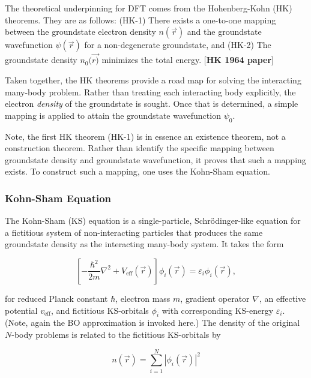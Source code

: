         The theoretical underpinning for DFT comes from the Hohenberg-Kohn (HK) theorems. They are as follows: (HK-1) There exists a one-to-one mapping between the groundstate electron density $n(\Vec{r})$ and the groundstate wavefunction $\psi (\Vec{r})$ for a non-degenerate groundstate, and (HK-2) The groundstate density $n_0(\Vec{r)}$ minimizes the total energy. [\textbf{HK 1964 paper}]
        
        Taken together, the HK theorems provide a road map for solving the interacting many-body problem. Rather than treating each interacting body explicitly, the electron \textit{density} of the groundstate is sought. Once that is determined, a simple mapping is applied to attain the groundstate wavefunction $\psi_0$.
        
        Note, the first HK theorem (HK-1) is in essence an existence theorem, not a construction theorem. Rather than identify the specific mapping between groundstate density and groundstate wavefunction, it proves that such a mapping exists. To construct such a mapping, one uses the Kohn-Sham equation.
        
        \subsubsection{Kohn-Sham Equation} 
        
        The Kohn-Sham (KS) equation is a single-particle, Schrödinger-like equation for a fictitious system of non-interacting particles that produces the same groundstate density as the interacting many-body system. It takes the form
        
        \begin{equation}
            \label{eq:ks}
            \left[-\frac{\hbar^2}{2 m}\nabla^2 + V_\text{eff}(\Vec{r}) \right]\phi_i(\Vec{r}) = \varepsilon_i \phi_i(\Vec{r}),
        \end{equation}
        
        \noindent for reduced Planck constant $\hbar$, electron mass $m$, gradient operator $\nabla$, an effective potential $v_\text{eff}$, and fictitious KS-orbitals $\phi_i$ with corresponding KS-energy $\varepsilon_i$. (Note, again the BO approximation is invoked here.) The density of the original $N$-body problems is related to the fictitious KS-orbitals by
        
        \begin{equation}
            n(\Vec{r}) = \sum\limits_{i=1}^N |\phi_i(\Vec{r}) |^2
        \end{equation}
        

